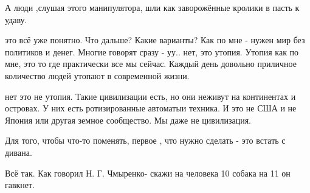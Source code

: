 \begin{itemize}
А люди ,слушая этого манипулятора, шли как заворожённые кролики в пасть к
удаву.


 

это всё уже понятно. Что дальше? Какие варианты? Как по мне - нужен мир без
политиков и денег. Многие говорят сразу - уу.. нет, это утопия. Утопия как по
мне, это то где практически все мы сейчас. Каждый день довольно приличное
количество людей утопают в современной жизни.

\begin{itemize}
 

нет это не утопия. Такие цивилизации есть, но они неживут на континентах и
островах. У них есть ротизированные автоматыи техника. И это не США и не Япония
или другая земное сообщество. Мы даже не цивилизация.

\end{itemize}

 
Для того, чтобы что-то поменять, первое , что нужно сделать - это встать с дивана.

 
Всё так. Как говорил Н. Г. Чмыренко- скажи на человека 10 собака на 11 он гавкнет.

 

\end{itemize}
